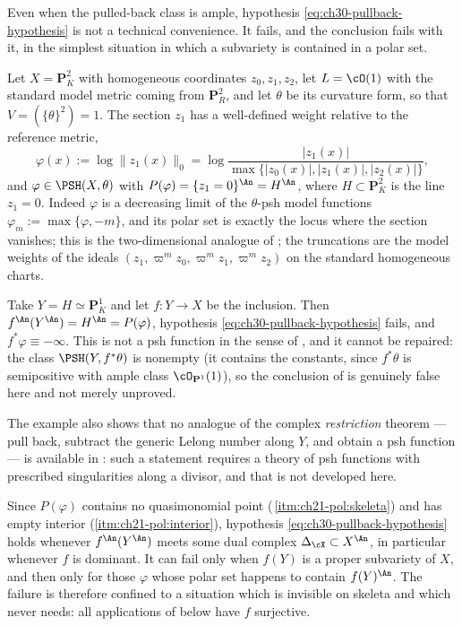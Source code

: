 Even when the pulled-back class is ample, hypothesis
\eqref{eq:ch30-pullback-hypothesis} is not a technical convenience.  It
fails, and the conclusion fails with it, in the simplest situation in
which a subvariety is contained in a polar set.

\begin{example}
\label{ex:ch30-polar-pullback-fails}
Let $X=\mathbf P^2_K$ with homogeneous coordinates $z_0,z_1,z_2$, let
$L=\cO(1)$ with the standard model metric coming from
$\mathbf P^2_R$, and let $\theta$ be its curvature form, so that
$V=(\{\theta\}^2)=1$.  The section $z_1$ has a well-defined weight
relative to the reference metric,
\[
        \varphi(x):=\log\lVert z_1(x)\rVert_0
        =\log\frac{|z_1(x)|}
        {\max\{|z_0(x)|,|z_1(x)|,|z_2(x)|\}},
\]
and $\varphi\in\PSH(X,\theta)$ with
$P(\varphi)=\{z_1=0\}^{\An}=H^{\An}$, where $H\subset\mathbf P^2_K$ is
the line $z_1=0$.  Indeed $\varphi$ is a decreasing limit of the
$\theta$-psh model functions
$\varphi_m:=\max\{\varphi,-m\}$, and its polar set is exactly the locus
where the section vanishes; this is the two-dimensional analogue of
; the truncations are the model weights of
the ideals $(z_1,\varpi^m z_0,\varpi^m z_1,\varpi^m z_2)$ on the
standard homogeneous charts.

Take $Y=H\simeq\mathbf P^1_K$ and let $f:Y\to X$ be the inclusion.  Then
$f^{\An}(Y^{\An})=H^{\An}=P(\varphi)$, hypothesis
\eqref{eq:ch30-pullback-hypothesis} fails, and
$f^*\varphi\equiv-\infty$.  This is not a psh function in the sense of
, and it cannot be repaired: the class
$\PSH(Y,f^*\theta)$ is nonempty (it contains the constants, since
$f^*\theta$ is semipositive with ample class $\cO_{\mathbf P^1}(1)$),
so the conclusion of  is genuinely false here
and not merely unproved.

The example also shows that no analogue of the complex \emph{restriction}
theorem --- pull back, subtract the generic Lelong number along $Y$, and
obtain a psh function --- is available in : such a statement
requires a theory of psh functions with prescribed singularities along a
divisor, and that is not developed here.
\end{example}

\begin{remark}
\label{rem:ch30-admissible-images}
Since $P(\varphi)$ contains no quasimonomial point
(\,\cref{itm:ch21-pol:skeleta}) and has empty
interior (\cref{itm:ch21-pol:interior}), hypothesis
\eqref{eq:ch30-pullback-hypothesis} holds whenever $f^{\An}(Y^{\An})$
meets some dual complex $\Delta_{\cX}\subset X^{\An}$, in particular
whenever $f$ is dominant.  It can fail only when $f(Y)$ is a proper
subvariety of $X$, and then only for those $\varphi$ whose polar set
happens to contain $f(Y)^{\An}$.  The failure is therefore confined to a
situation which is invisible on skeleta and which
 never needs: all applications of
 below have $f$ surjective.
\end{remark}

